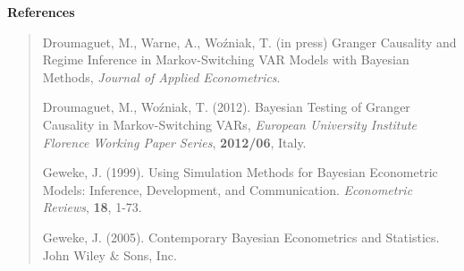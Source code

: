 \documentclass[final,3p,authoryear]{elsarticle}
\begin{document}
\bigskip\noindent\textbf{References}
\begin{quote}

\noindent Droumaguet, M., Warne, A., Wo\'zniak, T. (in press) Granger Causality and Regime Inference in Markov-Switching VAR Models with Bayesian Methods, \emph{Journal of Applied Econometrics}.

\smallskip\noindent Droumaguet, M., Wo\'zniak, T. (2012). Bayesian Testing of Granger Causality in Markov-Switching VARs, \emph{European University Institute Florence Working Paper Series}, \textbf{2012/06}, Italy.


\smallskip\noindent Geweke, J. (1999). Using Simulation Methods for Bayesian Econometric Models: Inference, Development, and Communication. \emph{Econometric Reviews}, \textbf{18}, 1-73.

\smallskip\noindent Geweke, J. (2005). Contemporary Bayesian Econometrics and Statistics. John Wiley \& Sons, Inc.

\end{quote}
\end{document}
